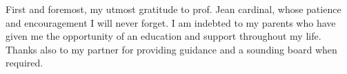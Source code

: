 \documentclass[
    english, %
    onehalfspacing, %
    headsepline, %
    parskip, %
]{MastersDoctoralThesis} %
\theoremstyle{definition}
\theoremstyle{remark}
\theoremstyle{plain}
\numberwithin{theorem}{section}
\begin{document}

    \begin{acknowledgements}
        \addchaptertocentry{\acknowledgementname} %
        First and foremost, my utmost gratitude to prof. Jean cardinal, whose patience and encouragement I will never forget.
        I am indebted to my parents who have given me the opportunity of an education and support throughout my life.
        Thanks also to my partner for providing guidance and a sounding board when required.

    \end{acknowledgements}

    \hypersetup{linkcolor=black}
    \tableofcontents %





\end{document}
